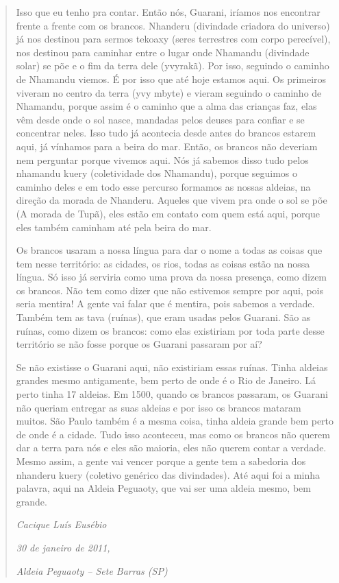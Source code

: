 \begin{quotation}
Isso que eu tenho pra contar. Então nós, Guarani, iríamos nos encontrar
frente a frente com os brancos. Nhanderu (divindade criadora do
universo) já nos destinou para sermos tekoaxy (seres terrestres com
corpo perecível), nos destinou para caminhar entre o lugar onde
Nhamandu (divindade solar) se põe e o fim da terra dele
(yvyrakã). Por isso, seguindo o caminho de Nhamandu viemos. É por isso
que até hoje estamos aqui. Os primeiros viveram no centro da terra (yvy
mbyte) e vieram seguindo o caminho de Nhamandu, porque assim é o caminho
que a alma das crianças faz, elas vêm desde onde o sol nasce, mandadas
pelos deuses para confiar e se concentrar neles. Isso tudo já acontecia
desde antes do brancos estarem aqui, já vínhamos para a beira do mar.
Então, os brancos não deveriam nem perguntar porque vivemos aqui. Nós
já sabemos disso tudo pelos nhamandu kuery (coletividade dos Nhamandu),
porque seguimos o caminho deles e em todo esse percurso formamos as
nossas aldeias, na direção da morada de Nhanderu. Aqueles que vivem pra
onde o sol se põe (A morada de Tupã), eles estão em contato com
quem está aqui, porque eles também caminham até pela beira do mar. 

Os brancos usaram a nossa língua para dar o nome a todas as coisas que
tem nesse território: as cidades, os rios, todas as coisas estão na
nossa língua. Só isso já serviria como uma prova da nossa presença,
como dizem os brancos. Não tem como dizer que não estivemos sempre por
aqui, pois seria mentira! A gente vai falar que é mentira, pois sabemos a
verdade. Também tem as tava (ruínas), que eram usadas pelos Guarani.
São as ruínas, como dizem os brancos: como elas existiriam por toda
parte desse território se não fosse porque os Guarani passaram por aí? 

Se não existisse o Guarani aqui, não existiriam essas ruínas. Tinha
aldeias grandes mesmo antigamente, bem perto de onde é o Rio de
Janeiro. Lá perto tinha 17 aldeias. Em 1500, quando os brancos
passaram, os Guarani não queriam entregar as suas aldeias e por isso os
brancos mataram muitos. São Paulo também é a mesma coisa, tinha aldeia
grande bem perto de onde é a cidade. Tudo isso aconteceu, mas como os
brancos não querem dar a terra para nós e eles são maioria, eles não
querem contar a verdade. Mesmo assim, a gente vai vencer porque a gente
tem a sabedoria dos nhanderu kuery (coletivo genérico das divindades).
Até aqui foi a minha palavra, aqui na Aldeia Peguaoty, que vai ser uma
aldeia mesmo, bem grande.
\medskip
\begin{flushright}
\emph{Cacique Luís Eusébio}

\emph{30 de janeiro de 2011,}

\emph{Aldeia Peguaoty – Sete Barras (SP)}

\end{flushright}
\end{quotation}

